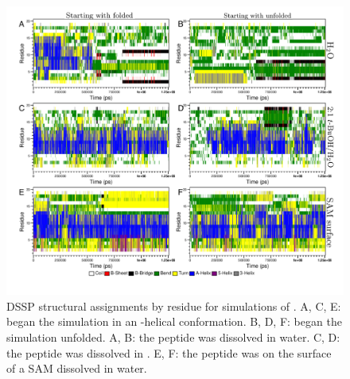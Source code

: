\begin{figure}
    \center
    \includegraphics[width=\double]{figures-helix/dssp.png}
    \caption[DSSP structural assignments by residue for \pep{}]{
        DSSP structural assignments by residue for simulations of \pep{}. 
        A, C, E: \pep{} began the simulation in an \textalpha{}-helical conformation. 
        B, D, F: \pep{} began the simulation unfolded.
        A, B: the peptide was dissolved in water. 
        C, D: the peptide was dissolved in \tbawat{}. 
        E, F: the peptide was on the surface of a SAM dissolved in water.
    }
    \label{fig:helix-dssp}
\end{figure}

